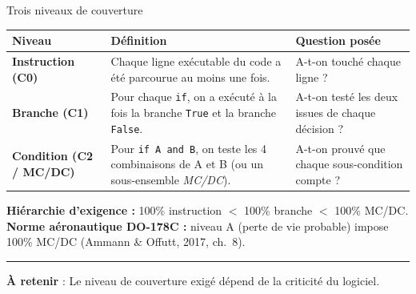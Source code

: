 \documentclass[aspectratio=169,11pt]{beamer}
\newcommand{\takeaway}[1]{%
\vfill\begin{beamercolorbox}[wd=\linewidth,sep=0.4em]{}
\color{accent2}\rule[0.6ex]{1.2em}{1.2pt}\hspace{0.4em}%
\textbf{\color{accent2}\small À retenir} \textcolor{textsoft}{:} %
{\small\color{textmain}#1}
\end{beamercolorbox}}
\begin{document}
\begin{frame}[t,shrink=10]{Trois niveaux de couverture}
\footnotesize
\begin{tabular}{@{}p{3.6cm} p{4.5cm} p{4.2cm}@{}}
\toprule
\textbf{Niveau} & \textbf{Définition} & \textbf{Question posée} \\
\midrule
\textbf{\color{accent}Instruction (C0)} & 
Chaque ligne exécutable du code a été parcourue au moins une fois.
& A-t-on touché chaque ligne ? \\
\addlinespace[0.2em]
\textbf{\color{accent2}Branche (C1)} & 
Pour chaque \texttt{if}, on a exécuté à la fois la branche \texttt{True} et la branche \texttt{False}.
& A-t-on testé les deux issues de chaque décision ? \\
\addlinespace[0.2em]
\textbf{\color{warn}Condition (C2 / MC/DC)} & 
Pour \texttt{if A and B}, on teste les 4 combinaisons de A et B (ou un sous-ensemble \emph{MC/DC}).
& A-t-on prouvé que chaque sous-condition compte ? \\
\bottomrule
\end{tabular}
\vspace{0.5cm}

\textbf{Hiérarchie d'exigence :} 100\% instruction $<$ 100\% branche $<$ 100\% MC/DC.\\[0.3em]
\textbf{Norme aéronautique DO-178C :} niveau A (perte de vie probable) impose 100\% MC/DC (Ammann \& Offutt, 2017, ch.~8).
\takeaway{Le niveau de couverture exigé dépend de la criticité du logiciel.}
\end{frame}
\end{document}
